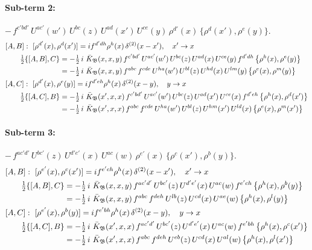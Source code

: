 \documentclass[10pt]{article}
\numberwithin{equation}{section}
\begin{document}
\paragraph{Sub-term 2:} $-\,f^{c'bd'}\,U^{ac'}(w')\,U^{bc}(z)\,U^{ad}(x')\,U^{ce}(y)\,\rho^{d'}(x)\,\big\{\rho^{d}(x'),\rho^{e}(y)\big\}$.
\begin{align}
&[A,B]:\ [\rho^{d'}(x),\rho^{d}(x')]=i f^{d'dh}\rho^{h}(x)\,\delta^{(2)}(x-x'),\quad x'\to x\notag\\
&\qquad \tfrac12\{[A,B],C\}=-\tfrac12\,i\,\,\bar K_{\mathfrak B}(x,x,y)\,f^{c'bd'}\,U^{ac'}(w')\,U^{bc}(z)\,U^{ad}(x)\,U^{ce}(y)\,f^{d'dh}\,\big\{\rho^{h}(x),\rho^{e}(y)\big\}\notag\\
&\qquad\phantom{\tfrac12\{[A,B],C\}}=-\tfrac12\,i\,\,\bar K_{\mathfrak B}(x,x,y)\,f^{abc}\,f^{cde}\,U^{ha}(w')\,U^{bl}(z)\,U^{hd}(x)\,U^{lm}(y)\,\big\{\rho^{e}(x),\rho^{m}(y)\big\}
\label{eq:GII.I2-2-AB}\\
&[A,C]:\ [\rho^{d'}(x),\rho^{e}(y)]=i f^{d'eh}\rho^{h}(x)\,\delta^{(2)}(x-y),\quad y\to x\notag\\
&\qquad \tfrac12\{[A,C],B\}=-\tfrac12\,i\,\,\bar K_{\mathfrak B}(x',x,x)\,f^{c'bd'}\,U^{ac'}(w')\,U^{bc}(z)\,U^{ad}(x')\,U^{ce}(x)\,f^{d'eh}\,\big\{\rho^{h}(x),\rho^{d}(x')\big\}\notag\\
&\qquad\phantom{\tfrac12\{[A,C],B\}}=-\tfrac12\,i\,\,\bar K_{\mathfrak B}(x',x,x)\,f^{abc}\,f^{cde}\,U^{ha}(w')\,U^{bl}(z)\,U^{hm}(x')\,U^{ld}(x)\,\big\{\rho^{e}(x),\rho^{m}(x')\big\}
\label{eq:GII.I2-2-AC}
\end{align}
\paragraph{Sub-term 3:} $-\,f^{ac'd'}\,U^{bc'}(z)\,U^{d'e'}(x)\,U^{ac}(w)\,\rho^{e'}(x)\,\big\{\rho^{c}(x'),\rho^{b}(y)\big\}$.
\begin{align}
&[A,B]:\ [\rho^{e'}(x),\rho^{c}(x')]=i f^{e'ch}\rho^{h}(x)\,\delta^{(2)}(x-x'),\quad x'\to x\notag\\
&\qquad \tfrac12\{[A,B],C\}=-\tfrac12\,i\,\,\bar K_{\mathfrak B}(x,x,y)\,f^{ac'd'}\,U^{bc'}(z)\,U^{d'e'}(x)\,U^{ac}(w)\,f^{e'ch}\,\big\{\rho^{h}(x),\rho^{b}(y)\big\}\notag\\
&\qquad\phantom{\tfrac12\{[A,B],C\}}=-\tfrac12\,i\,\,\bar K_{\mathfrak B}(x,x,y)\,f^{abc}\,f^{deh}\,U^{lb}(z)\,U^{cd}(x)\,U^{ae}(w)\,\big\{\rho^{h}(x),\rho^{l}(y)\big\}
\label{eq:GII.I2-3-AB}\\
&[A,C]:\ [\rho^{e'}(x),\rho^{b}(y)]=i f^{e'bh}\rho^{h}(x)\,\delta^{(2)}(x-y),\quad y\to x\notag\\
&\qquad \tfrac12\{[A,C],B\}=-\tfrac12\,i\,\,\bar K_{\mathfrak B}(x',x,x)\,f^{ac'd'}\,U^{bc'}(z)\,U^{d'e'}(x)\,U^{ac}(w)\,f^{e'bh}\,\big\{\rho^{h}(x),\rho^{c}(x')\big\}\notag\\
&\qquad\phantom{\tfrac12\{[A,C],B\}}=-\tfrac12\,i\,\,\bar K_{\mathfrak B}(x',x,x)\,f^{abc}\,f^{deh}\,U^{eb}(z)\,U^{cd}(x)\,U^{al}(w)\,\big\{\rho^{h}(x),\rho^{l}(x')\big\}
\label{eq:GII.I2-3-AC}
\end{align}
\end{document}
